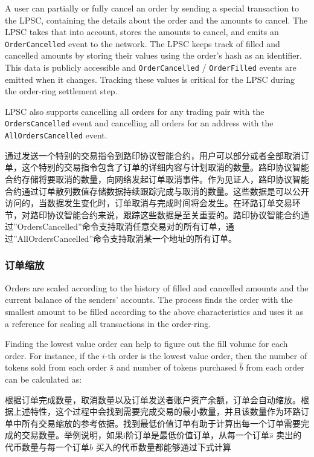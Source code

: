 \documentclass[UTF8,nofonts]{ctexart}
\begin{document}
\begin{multicols}{2}
A user can partially or fully cancel an order by sending a special transaction to the LPSC, containing the details about the order and the amounts to cancel. The LPSC takes that into account, stores the amounts to cancel, and emits an \verb|OrderCancelled| event to the network. The LPSC keeps track of filled and cancelled amounts by storing their values using the order's hash as an identifier. This data is publicly accessible and \verb|OrderCancelled| / \verb|OrderFilled| events are emitted when it changes. Tracking these values is critical for the LPSC during the order-ring settlement step.

LPSC also supports cancelling all orders for any trading pair with the \verb|OrdersCancelled| event  and cancelling all orders for an address with the \verb|AllOrdersCancelled| event.

通过发送一个特别的交易指令到路印协议智能合约，用户可以部分或者全部取消订单，这个特别的交易指令包含了订单的详细内容与计划取消的数量。路印协议智能合约存储将要取消的数量，向网络发起订单取消事件。作为见证人，路印协议智能合约通过订单散列数值存储数据持续跟踪完成与取消的数量。这些数据是可以公开访问的，当数据发生变化时，订单取消与完成时间将会发生。在环路订单交易环节，对路印协议智能合约来说，跟踪这些数据是至关重要的。路印协议智能合约通过”OrdersCancelled”命令支持取消任意交易对的所有订单，通过”AllOrdersCancelled”命令支持取消某一个地址的所有订单。


\subsubsection{订单缩放\label{sec:order_scaling}}
Orders are scaled according to the history of filled and cancelled amounts and the current balance of the senders' accounts. The process finds the order with the smallest amount to be filled according to the above characteristics and uses it as a reference for scaling all transactions in the order-ring.


Finding the lowest value order can help to figure out the fill volume for each order. For instance, if the $i$-th order is the lowest value order, then the number of tokens sold from each order $\hat{s}$ and number of tokens purchased $\hat{b}$ from each order can be calculated as:

根据订单完成数量，取消数量以及订单发送者账户资产余额，订单会自动缩放。根据上述特性，这个过程中会找到需要完成交易的最小数量，并且该数量作为环路订单中所有交易缩放的参考依据。找到最低价值订单有助于计算出每一个订单需要完成的交易数量。举例说明，如果i阶订单是最低价值订单，从每一个订单$\hat{s}$ 卖出的代币数量与每一个订单$\hat{b}$ 买入的代币数量都能够通过下式计算



\end{multicols}
\end{document}
